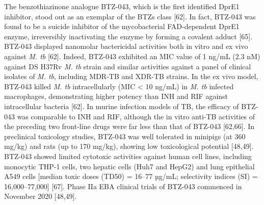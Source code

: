 \documentclass{article}
\begin{document}
The benzothiazinone analogue BTZ-043, which is the first identified DprE1 inhibitor, stood out as an exemplar of the BTZs class [62]. In fact, BTZ-043 was found to be a suicide inhibitor of the mycobacterial FAD-dependent DprE1 enzyme, irreversibly inactivating the enzyme by forming a covalent adduct [65]. BTZ-043 displayed nanomolar bactericidal activities both in vitro and ex vivo against \textit{M. tb} [62]. Indeed, BTZ-043 exhibited an MIC value of 1 ng/mL (2.3 nM) against DS H37Rv \textit{M. tb} strain and similar activities against a panel of clinical isolates of \textit{M. tb}, including MDR-TB and XDR-TB strains. In the ex vivo model, BTZ-043 killed \textit{M. tb} intracellularly (MIC < 10 ng/mL) in \textit{M. tb} infected macrophages, demonstrating higher potency than INH and RIF against intracellular bacteria [62]. In murine infection models of TB, the efficacy of BTZ-043 was comparable to INH and RIF, although the in vitro anti-TB activities of the preceding two front-line drugs were far less than that of BTZ-043 [62,66]. In preclinical toxicology studies, BTZ-043 was well tolerated in minipigs (at 360 mg/kg) and rats (up to 170 mg/kg), showing low toxicological potential [48,49]. BTZ-043 showed limited cytotoxic activities against human cell lines, including monocytic THP-1 cells, two hepatic cells (Huh7 and HepG2) and lung epithelial A549 cells [median toxic doses (TD50) = 16–77 µg/mL; selectivity indices (SI) = 16,000–77,000] [67]. Phase IIa EBA clinical trials of BTZ-043 commenced in November 2020 [48,49].
\end{document}
